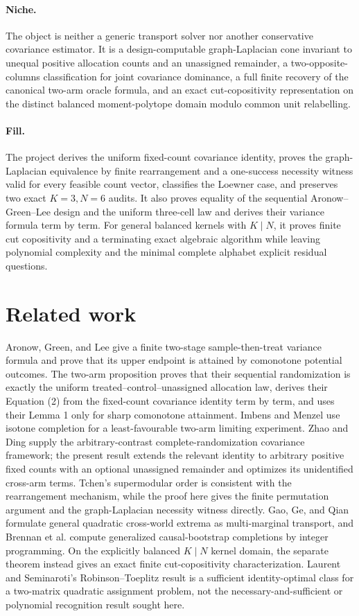 \documentclass{article}
\begin{document}
\paragraph{Niche.} The object is neither a generic transport solver nor another conservative covariance estimator.  It is a design-computable graph-Laplacian cone invariant to unequal positive allocation counts and an unassigned remainder, a two-opposite-columns classification for joint covariance dominance, a full finite recovery of the canonical two-arm oracle formula, and an exact cut-copositivity representation on the distinct balanced moment-polytope domain modulo common unit relabelling.

\paragraph{Fill.} The project derives the uniform fixed-count covariance identity, proves the graph-Laplacian equivalence by finite rearrangement and a one-success necessity witness valid for every feasible count vector, classifies the Loewner case, and preserves two exact \(K=3,N=6\) audits.  It also proves equality of the sequential Aronow--Green--Lee design and the uniform three-cell law and derives their variance formula term by term.  For general balanced kernels with \(K\mid N\), it proves finite cut copositivity and a terminating exact algebraic algorithm while leaving polynomial complexity and the minimal complete alphabet explicit residual questions.

\section{Related work}

Aronow, Green, and Lee give a finite two-stage sample-then-treat variance formula and prove that its upper endpoint is attained by comonotone potential outcomes.  The two-arm proposition proves that their sequential randomization is exactly the uniform treated--control--unassigned allocation law, derives their Equation (2) from the fixed-count covariance identity term by term, and uses their Lemma 1 only for sharp comonotone attainment.  Imbens and Menzel use isotone completion for a least-favourable two-arm limiting experiment.  Zhao and Ding supply the arbitrary-contrast complete-randomization covariance framework; the present result extends the relevant identity to arbitrary positive fixed counts with an optional unassigned remainder and optimizes its unidentified cross-arm terms.  Tchen's supermodular order is consistent with the rearrangement mechanism, while the proof here gives the finite permutation argument and the graph-Laplacian necessity witness directly.  Gao, Ge, and Qian formulate general quadratic cross-world extrema as multi-marginal transport, and Brennan et al. compute generalized causal-bootstrap completions by integer programming.  On the explicitly balanced \(K\mid N\) kernel domain, the separate theorem instead gives an exact finite cut-copositivity characterization.  Laurent and Seminaroti's Robinson--Toeplitz result is a sufficient identity-optimal class for a two-matrix quadratic assignment problem, not the necessary-and-sufficient or polynomial recognition result sought here.
\end{document}
